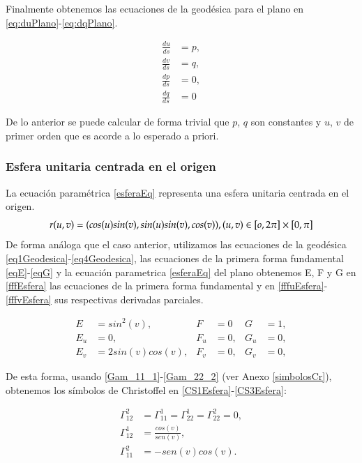 \documentclass{endm}
\begin{document}
Finalmente obtenemos las ecuaciones de la geod\'esica para el plano en \ref{eq:duPlano}-\ref{eq:dqPlano}.

{\small
\begin{align}
\frac{du}{ds}&=p,\label{eq:duPlano} \\
\frac{dv}{ds}&=q,\label{eq:dvPlano}     \\
\frac{dp}{ds}&=0, \label{eq:dpPlano}\\ 
\frac{dq}{ds}&=0 \label{eq:dqPlano}
\end{align}
}

De lo anterior se puede calcular de forma trivial que $p$, $q$ son constantes y $u$, $v$ de primer orden que es acorde a lo esperado a priori.

\subsubsection{Esfera unitaria centrada en el origen\cite{rubio&leon}}

La ecuaci\'on param\'etrica \ref{esferaEq} representa una esfera unitaria centrada en el origen.
\begin{equation} \label{esferaEq}
r(u,v) = (cos (u) sin(v), sin (u) sin (v),cos (v)), \\
(u,v) \in  [o, 2 \pi] \times [0, \pi]
\end{equation}
De forma an\'aloga que el caso anterior, utilizamos las ecuaciones de la geod\'esica \ref{eq1Geodesica}-\ref{eq4Geodesica}, las ecuaciones de la primera forma fundamental \ref{eqE}-\ref{eqG} y la ecuaci\'on parametrica \ref{esferaEq} del plano obtenemos E, F y G en \ref{fffEsfera} las ecuaciones de la primera forma fundamental y en \ref{fffuEsfera}-\ref{fffvEsfera} sus respectivas derivadas parciales.

\begin{align}
E&=sin^2 (v),   & F &=0    & G&=1, \label{fffEsfera} \\
E_u&=0,     & F_u&=0,   & G_u&=0, \label{fffuEsfera}\\
E_v&=2sin(v)cos(v),    & F_v&=0,   & G_v&=0, \label{fffvEsfera}
\end{align}

De esta forma, usando \ref{Gam_11_1}-\ref{Gam_22_2} (ver Anexo \ref{simbolosCr}), obtenemos los s\'imbolos de Christoffel en \ref{CS1Esfera}-\ref{CS3Esfera}:

{\small
\begin{align}
\Gamma_{12}^2&=\Gamma_{11}^1=\Gamma_{22}^1=\Gamma_{22}^2=0, \label{CS1Esfera} \\
\Gamma_{12}^1&=\frac{cos(v)}{sen(v)},  \label{CS2Esfera}   \\
\Gamma_{11}^2&=-sen(v)cos(v) .  \label{CS3Esfera}
\end{align}
}
\end{document}
